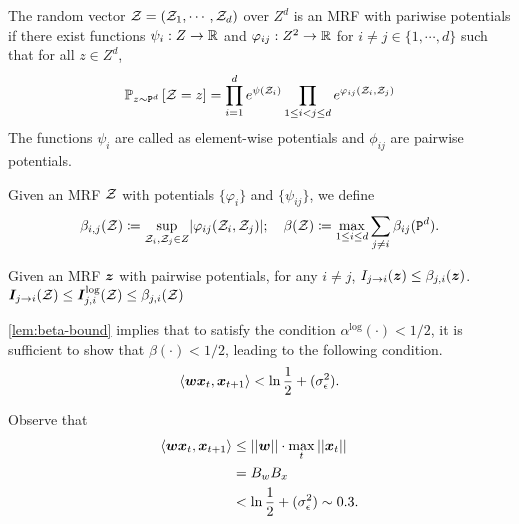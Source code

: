 \begin{definition}
The random vector $\mathcal{Z} = (\mathcal{Z}_1, \cdots, \mathcal{Z}_d)$ over $Z^d$ is an MRF with pariwise potentials if there exist functions $\psi_i : Z \rightarrow \mathbb{R}$ and $\varphi_{ij}: Z^2 \rightarrow \mathbb{R}$ for $i \neq j \in \{ 1, \cdots, d \}$ such that for all $z \in Z^d$,
\begin{equation*}
    \mathbb{P}_{z \sim \mathtt{P}^d }
    \left[ 
    \mathcal{Z} = z
    \right]
    =
    \prod_{i=1}^d
    e^{\psi(\mathcal{Z}_i)}
    \prod_{1 \leq i < j \leq d}
    e^{\varphi_{ij}(\mathcal{Z}_i, \mathcal{Z}_j)}
\end{equation*}
The functions $\psi_i$ are called as element-wise potentials and $\phi_{ij}$ are pairwise potentials.  
\end{definition}

\begin{definition}
Given an MRF $\mathcal{Z}$ with potentials $\{ \varphi_i \}$ and $\{ \psi_{ij}\}$, we define
    \begin{equation*}
        \beta_{i,j}(\mathcal{Z})
        \coloneqq
        \sup_{\mathcal{Z}_i, \mathcal{Z}_j \in Z}
        \lvert
        \varphi_{ij}( \mathcal{Z}_i, \mathcal{Z}_j )
        \rvert;
        \quad
        \beta(\mathcal{Z})
        \coloneqq
        \max_{1 \leq i \leq d}
        \sum_{j \neq i}
        \beta_{ij}
        ( \mathtt{P}^d ).
    \end{equation*}
\end{definition}

\begin{lemma}\label{lem:beta-bound}
    Given an MRF $\bm{z}$ with pairwise potentials, for any $i \neq j$, $I_{j \rightarrow i}(\bm{z}) \leq \beta_{j,i}(\bm{z})$.
    $ \bm{I}_{j\rightarrow i}(\mathcal{Z})
    \leq
    \bm{I}^{\log}_{j,i}(\mathcal{Z}) 
    \leq 
    \beta_{j,i}(\mathcal{Z})$
    
\end{lemma}
\cref{lem:beta-bound} implies that to satisfy the condition $\alpha^{\log}(\cdot) < 1/2$, it is sufficient to show that $\beta(\cdot) < 1/2$, leading to the following condition.
\begin{equation}
    \langle \bm{w} \bm{x}_{t}, \bm{x}_{t+1} \rangle < \ln \frac{1}{2} + ( \sigma_{\epsilon}^2 ).
\end{equation}

Observe that
\begin{align*}
        \langle \bm{w} \bm{x}_{t}, \bm{x}_{t+1} \rangle 
        &\leq
        \left\lvert \left\lvert\bm{w}\right\rvert \right\rvert \cdot \max_t \left\lvert \left\lvert\bm{x}_t\right\rvert \right\rvert
        \\
        &= B_w B_x
        \\&< \ln \frac{1}{2} + ( \sigma_{\epsilon}^2 )
        \sim 0.3
        .
\end{align*}

